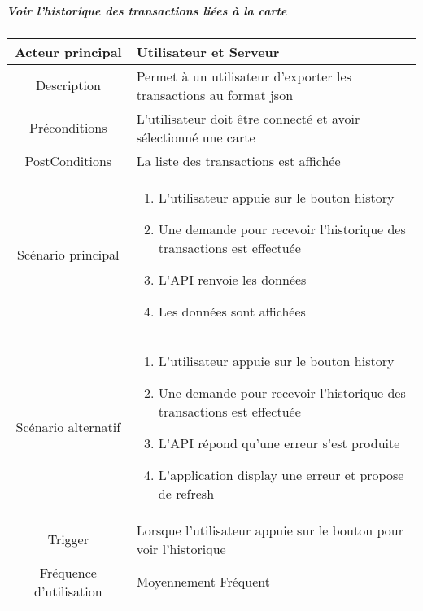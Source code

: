 \documentclass{article}
\begin{document}
\subparagraph{Voir l'historique des transactions liées à la carte}
    \begin{table}[h]
        \begin{tabular}{|c|p{10cm}|}
        \hline
        Acteur principal& Utilisateur et Serveur    \\
        \hline
        Description&  Permet à un utilisateur d'exporter les transactions au format json  \\
        \hline
        Préconditions& L'utilisateur doit être connecté et avoir sélectionné une carte \\
        \hline
        PostConditions&  La liste des transactions est affichée   \\
        \hline
        Scénario principal& 
                \begin{enumerate}
                    \item L'utilisateur appuie sur le bouton history
                    \item Une demande pour recevoir l'historique des transactions est effectuée
                    \item L'API renvoie les données
                    \item Les données sont affichées
                \end{enumerate}     \\
        \hline
        Scénario alternatif&  
            \begin{enumerate}
                \item L'utilisateur appuie sur le bouton history
                \item Une demande pour recevoir l'historique des transactions est effectuée
                \item L'API répond qu'une erreur s'est produite
                \item L'application display une erreur et propose de refresh
            \end{enumerate}     \\
        \hline
        Trigger&   Lorsque l'utilisateur appuie sur le bouton pour voir l'historique  \\
        \hline
        Fréquence d'utilisation&  Moyennement Fréquent  \\
        \hline
        \end{tabular}
    \end{table}

\newpage
\end{document}
